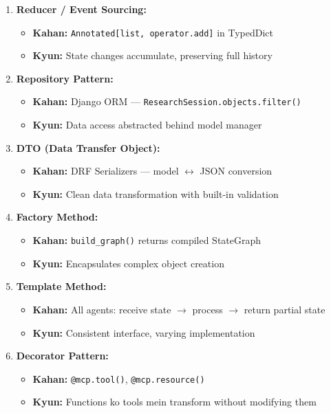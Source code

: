 \documentclass[11pt,a4paper,twoside]{report}
\begin{document}
\begin{enumerate}[label=\textbf{\arabic*.}]
\item \textbf{Reducer / Event Sourcing:}
\begin{itemize}
    \item \textbf{Kahan:} \texttt{Annotated[list, operator.add]} in TypedDict
    \item \textbf{Kyun:} State changes accumulate, preserving full history
\end{itemize}

\item \textbf{Repository Pattern:}
\begin{itemize}
    \item \textbf{Kahan:} Django ORM --- \texttt{ResearchSession.objects.filter()}
    \item \textbf{Kyun:} Data access abstracted behind model manager
\end{itemize}

\item \textbf{DTO (Data Transfer Object):}
\begin{itemize}
    \item \textbf{Kahan:} DRF Serializers --- model $\leftrightarrow$ JSON conversion
    \item \textbf{Kyun:} Clean data transformation with built-in validation
\end{itemize}

\item \textbf{Factory Method:}
\begin{itemize}
    \item \textbf{Kahan:} \texttt{build\_graph()} returns compiled StateGraph
    \item \textbf{Kyun:} Encapsulates complex object creation
\end{itemize}

\item \textbf{Template Method:}
\begin{itemize}
    \item \textbf{Kahan:} All agents: receive state $\rightarrow$ process $\rightarrow$ return partial state
    \item \textbf{Kyun:} Consistent interface, varying implementation
\end{itemize}

\item \textbf{Decorator Pattern:}
\begin{itemize}
    \item \textbf{Kahan:} \texttt{@mcp.tool()}, \texttt{@mcp.resource()}
    \item \textbf{Kyun:} Functions ko tools mein transform without modifying them
\end{itemize}


\end{enumerate}
\end{document}
